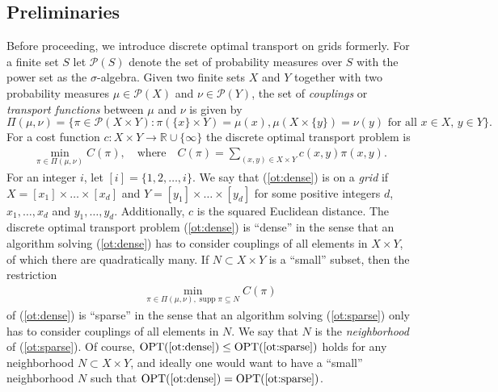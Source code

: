 \documentclass[a4paper,UKenglish,cleveref, autoref, thm-restate]{lipics-v2021}
\DeclareMathOperator{\supp}{supp}
\DeclareMathOperator{\OPT}{OPT}
\begin{document}
\subsection{Preliminaries}
Before proceeding, we introduce discrete optimal transport on grids formerly.
For a finite set $S$ let $\mathcal{P}(S)$ denote the set of probability measures over $S$ with the power set as the $\sigma$-algebra.
Given two finite sets $X$ and $Y$ together with two probability measures $\mu \in \mathcal{P}(X)$ and $\nu \in \mathcal{P}(Y)$, the set of \emph{couplings} or \emph{transport functions} between $\mu$ and $\nu$ is given by
\[
\Pi(\mu,\nu) = \{\pi \in \mathcal{P}(X \times Y): \pi(\{x\} \times Y) = \mu(x), \mu(X \times \{y\}) = \nu(y) \text{ for all $x \in X$, $y \in Y$}\}.
\]
For a cost function $c: X \times Y \rightarrow \mathbb{R} \cup \{\infty\}$ the discrete optimal transport problem is
\begin{align}\tag{$P$}\label{ot:dense}
\min_{\pi \in \Pi(\mu,\nu)} C(\pi), \quad\text{where}\quad C(\pi) = \sum_{(x,y) \in X \times Y} c(x,y)\pi(x,y).
\end{align}
For an integer $i$, let $[i] = \{1, 2, \dots, i\}$.
We say that (\ref{ot:dense}) is on a \emph{grid} if $X = [x_1] \times \dots \times [x_d]$ and $Y = [y_1] \times \dots \times [y_d]$ for some positive integers $d$, $x_1, \dots, x_d$ and $y_1, \dots, y_d$.
Additionally, $c$ is the squared Euclidean distance.
The discrete optimal transport problem (\ref{ot:dense}) is ``dense'' in the sense that an algorithm solving (\ref{ot:dense}) has to consider couplings of all elements in $X \times Y$, of which there are quadratically many.
If $N \subset X \times Y$ is a ``small'' subset, then the restriction
\begin{align}\tag{$P'$}\label{ot:sparse}
\min_{\pi \in \Pi(\mu,\nu), \supp \pi \subseteq N} C(\pi)
\end{align}
of (\ref{ot:dense}) is ``sparse'' in the sense that an algorithm solving (\ref{ot:sparse}) only has to consider couplings of all elements in $N$.
We say that $N$ is the \emph{neighborhood} of (\ref{ot:sparse}).
Of course, $\OPT(\text{\ref{ot:dense}}) \leq \OPT(\text{\ref{ot:sparse}})$ holds for any neighborhood $N \subset X \times Y$, and ideally one would want to have a ``small'' neighborhood $N$ such that $\OPT(\text{\ref{ot:dense}}) = \OPT(\text{\ref{ot:sparse}})$.
\end{document}
